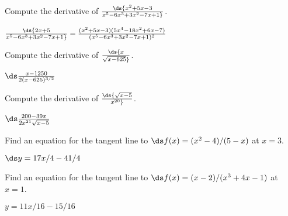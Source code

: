 \begin{enumialphparenastyle}
\begin{ex} 
Compute the derivative of $\ds {x^2+5x-3\over x^5-6x^3+3x^2-7x+1}$.
\begin{sol} 
$\ds {2x+5\over x^5-6x^3+3x^2-7x+1}-{(x^2+5x-3)(5x^4-18x^2+6x-7)\over(x^5-6x^3+3x^2-7x+1)^2}$
\end{sol}
\end{ex}

\begin{ex} 
Compute the derivative of $\ds {x\over\sqrt{x-625}}$.
\begin{sol} 
$\ds \frac{x-1250}{2(x-625)^{3/2}}$
\end{sol}
\end{ex}

\begin{ex} 
Compute the derivative of $\ds {\sqrt{x-5}\over x^{20}}$.
\begin{sol} 
$\ds \frac{200-39x}{2x^{21}\sqrt{x-5}}$
\end{sol}
\end{ex}

\begin{ex} 
Find an equation for the tangent line to $\ds f(x) = (x^2 -
4)/(5-x)$ at $x= 3$.  
\begin{sol} 
$\ds y=17x/4-41/4$ 
\end{sol}
\end{ex}

\begin{ex} 
Find an equation for the tangent line to 
$\ds f(x) = (x-2)/(x^3 + 4x - 1)$ at $x=1$.
\begin{sol} 
$y=11x/16-15/16$
\end{sol}
\end{ex}



\end{enumialphparenastyle}
